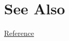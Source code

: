 \documentclass{article}
\begin{document}
% 
% 
% 
% 
% 
% 

\section*{See Also}
\href{\kmlroot/reference/}{Reference}




\end{document}
